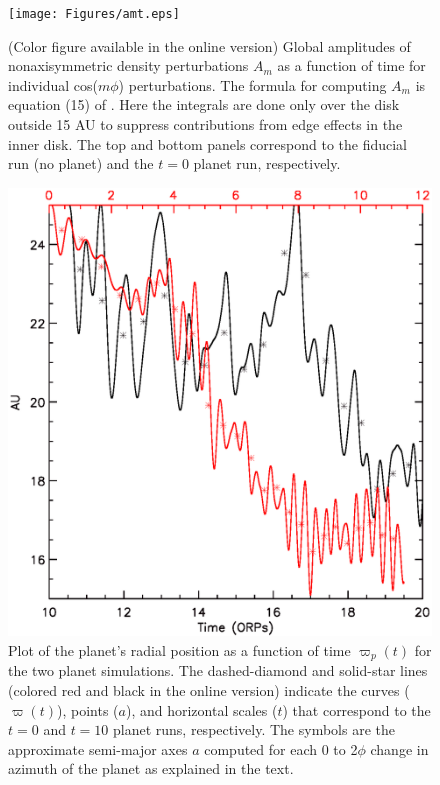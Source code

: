 \documentclass[12pt,manuscript,authoryear]{aastex}
\begin{document}



\newpage

\begin{figure}[t]
\center
\texttt{[image: Figures/amt.eps]}
\caption{(Color figure available in the online version) Global amplitudes of nonaxisymmetric density perturbations $A_m$
  as a function of time for individual cos($m\phi$) perturbations. The formula for computing $A_m$ is equation (15) of
  \citep{boley2006}. Here the integrals are done only over the disk outside 15 AU to suppress contributions from edge
  effects in the inner disk. The top and bottom panels correspond to the fiducial run (no planet) and the $t = 0$ planet
  run, respectively.}
\label{fig:Am}
\end{figure}

\begin{figure}[t]
\center
\includegraphics[width=12cm]{Figures/planeta.eps}
\caption{Plot of the planet's radial position as a function of time $\varpi_p(t)$ for the two planet simulations. The
  dashed-diamond and solid-star lines (colored red and black in the online version) indicate the curves ($\varpi(t)$),
  points ($a$), and horizontal scales ($t$) that correspond to the $t = 0$ and $t = 10$ planet runs, respectively. The
  symbols are the approximate semi-major axes $a$ computed for each 0 to 2$\phi$ change in azimuth of the planet as
  explained in the text.}
\label{fig:a}
\end{figure}
\end{document}
